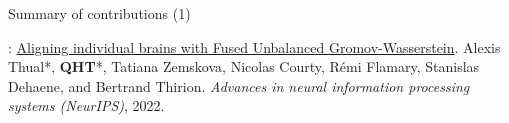 \documentclass{beamer}
\begin{document}
\begin{frame}{Summary of contributions (1)}
  \scriptsize

  \vspace{-4cm}
  {}: \ul{Aligning individual brains with Fused Unbalanced Gromov-Wasserstein}.
  Alexis Thual*, \textbf{QHT}*, Tatiana Zemskova, Nicolas Courty,
  Rémi Flamary, Stanislas Dehaene, and Bertrand Thirion.
  \textit{Advances in neural information processing systems (NeurIPS)}, 2022.


\end{frame}
\end{document}
